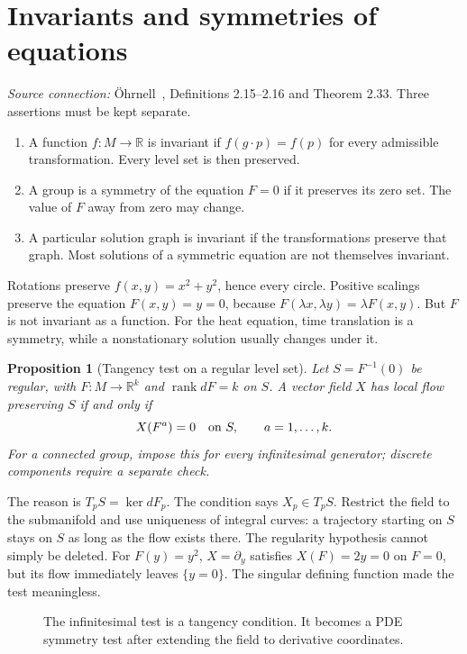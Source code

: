\documentclass[11pt,a4paper]{article}
\numberwithin{equation}{section}
\theoremstyle{definition}
\theoremstyle{plain}
\newtheorem{proposition}[definition]{Proposition}
\theoremstyle{remark}
\newcommand{\R}{\mathbb R}
\newcommand{\rank}{\operatorname{rank}}
\newcommand{\source}[1]{\textit{Source connection:} \"Ohrnell~\cite{ohrnell}, #1.}
\begin{document}
\section{Invariants and symmetries of equations}\label{sec:invariance}
\source{Definitions 2.15--2.16 and Theorem 2.33}
Three assertions must be kept separate.
\begin{enumerate}
\item A function $f:M\to\R$ is invariant if $f(g\cdot p)=f(p)$ for every admissible transformation. Every level set is then preserved.
\item A group is a symmetry of the equation $F=0$ if it preserves its zero set. The value of $F$ away from zero may change.
\item A particular solution graph is invariant if the transformations preserve that graph. Most solutions of a symmetric equation are not themselves invariant.
\end{enumerate}

Rotations preserve $f(x,y)=x^2+y^2$, hence every circle. Positive scalings preserve the equation $F(x,y)=y=0$, because $F(\lambda x,\lambda y)=\lambda F(x,y)$. But $F$ is not invariant as a function. For the heat equation, time translation is a symmetry, while a nonstationary solution usually changes under it.

\begin{proposition}[Tangency test on a regular level set]
Let $S=F^{-1}(0)$ be regular, with $F:M\to\R^k$ and $\rank dF=k$ on $S$. A vector field $X$ has local flow preserving $S$ if and only if
\[
X(F^a)=0\quad\hbox{on }S,\qquad a=1,\ldots,k.
\]
For a connected group, impose this for every infinitesimal generator; discrete components require a separate check.
\end{proposition}
The reason is $T_pS=\ker dF_p$. The condition says $X_p\in T_pS$. Restrict the field to the submanifold and use uniqueness of integral curves: a trajectory starting on $S$ stays on $S$ as long as the flow exists there. The regularity hypothesis cannot simply be deleted. For $F(y)=y^2$, $X=\partial_y$ satisfies $X(F)=2y=0$ on $F=0$, but its flow immediately leaves $\{y=0\}$. The singular defining function made the test meaningless.

\begin{figure}[htbp]\centering
{}
\caption{The infinitesimal test is a tangency condition. It becomes a PDE symmetry test after extending the field to derivative coordinates.}
\end{figure}
\end{document}

